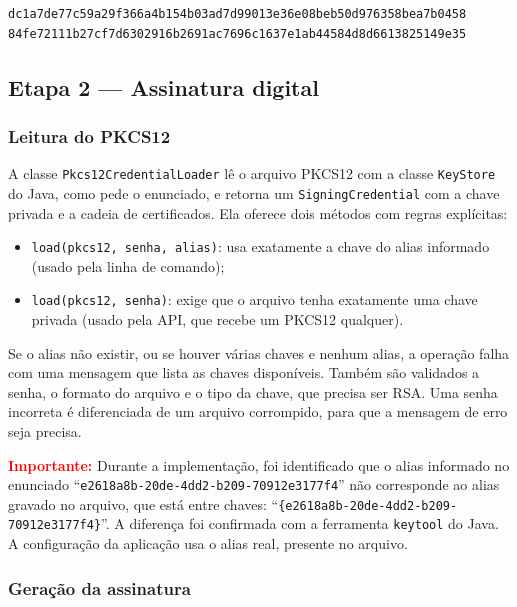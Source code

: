\documentclass[12pt,a4paper]{article}
\begin{document}
\begin{lstlisting}
dc1a7de77c59a29f366a4b154b03ad7d99013e36e08beb50d976358bea7b0458
84fe72111b27cf7d6302916b2691ac7696c1637e1ab44584d8d6613825149e35
\end{lstlisting}

\subsection{Etapa 2 --- Assinatura digital}

\subsubsection{Leitura do PKCS12}

A classe \texttt{Pkcs12CredentialLoader} lê o arquivo PKCS12 com a classe \texttt{KeyStore} do Java, como pede o enunciado, e retorna um \texttt{SigningCredential} com a chave privada e a cadeia de certificados. Ela oferece dois métodos com regras explícitas:

\begin{itemize}
    \item \texttt{load(pkcs12, senha, alias)}: usa exatamente a chave do alias informado (usado pela linha de comando);
    \item \texttt{load(pkcs12, senha)}: exige que o arquivo tenha exatamente uma chave privada (usado pela API, que recebe um PKCS12 qualquer).
\end{itemize}

Se o alias não existir, ou se houver várias chaves e nenhum alias, a operação falha com uma mensagem que lista as chaves disponíveis. Também são validados a senha, o formato do arquivo e o tipo da chave, que precisa ser RSA. Uma senha incorreta é diferenciada de um arquivo corrompido, para que a mensagem de erro seja precisa.

\noindent\textcolor{red}{\textbf{Importante:}} Durante a implementação, foi identificado que o alias informado no enunciado ``\texttt{e2618a8b-20de-4dd2-b209-70912e3177f4}'' não corresponde ao alias gravado no arquivo, que está entre chaves: ``\texttt{\{e2618a8b-20de-4dd2-b209-70912e3177f4\}}''. A diferença foi confirmada com a ferramenta \texttt{keytool} do Java. A configuração da aplicação usa o alias real, presente no arquivo.

\subsubsection{Geração da assinatura}
\end{document}
